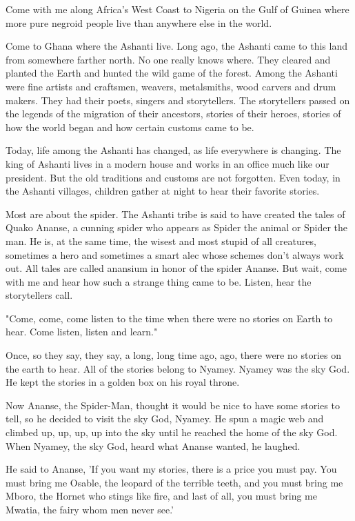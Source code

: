 Come with me along Africa's West Coast to Nigeria on the Gulf of Guinea where more pure negroid people live than anywhere else in the world.

Come to Ghana where the Ashanti live. Long ago, the Ashanti came to this land from somewhere farther north. No one really knows where. They cleared and planted the Earth and hunted the wild game of the forest. Among the Ashanti were fine artists and craftsmen, weavers, metalsmiths, wood carvers and drum makers. They had their poets, singers and storytellers. The storytellers passed on the legends of the migration of their ancestors, stories of their heroes, stories of how the world began and how certain customs came to be.

Today, life among the Ashanti has changed, as life everywhere is changing. The king of Ashanti lives in a modern house and works in an office much like our president. But the old traditions and customs are not forgotten. Even today, in the Ashanti villages, children gather at night to hear their favorite stories.

Most are about the spider. The Ashanti tribe is said to have created the tales of Quako Ananse, a cunning spider who appears as Spider the animal or Spider the man. He is, at the same time, the wisest and most stupid of all creatures, sometimes a hero and sometimes a smart alec whose schemes don't always work out. All tales are called anansium in honor of the spider Ananse. But wait, come with me and hear how such a strange thing came to be. Listen, hear the storytellers call.

"Come, come, come listen to the time when there were no stories on Earth to hear. Come listen, listen and learn."

Once, so they say, they say, a long, long time ago, ago, there were no stories on the earth to hear. All of the stories belong to Nyamey. Nyamey was the sky God. He kept the stories in a golden box on his royal throne.

Now Ananse, the Spider-Man, thought it would be nice to have some stories to tell, so he decided to visit the sky God, Nyamey. He spun a magic web and climbed up, up, up, up into the sky until he reached the home of the sky God. When Nyamey, the sky God, heard what Ananse wanted, he laughed.

He said to Ananse, 'If you want my stories, there is a price you must pay. You must bring me Osable, the leopard of the terrible teeth, and you must bring me Mboro, the Hornet who stings like fire, and last of all, you must bring me Mwatia, the fairy whom men never see.'

